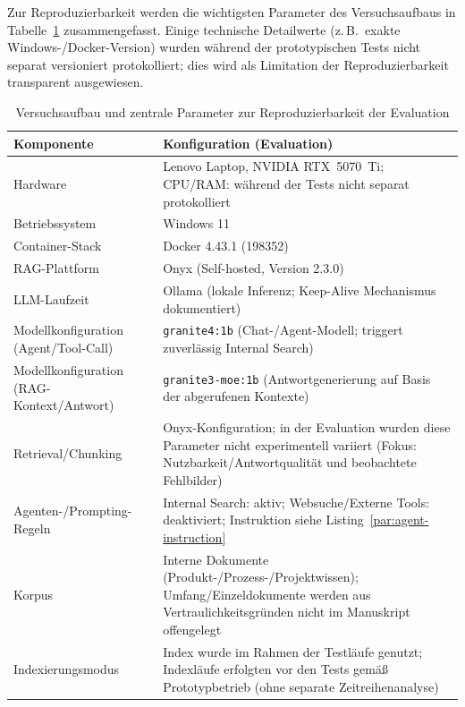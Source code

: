Zur Reproduzierbarkeit werden die wichtigsten Parameter des Versuchsaufbaus in Tabelle~\ref{tab:eval-setup} zusammengefasst.
Einige technische Detailwerte (z.\,B.\ exakte Windows-/Docker-Version) wurden während der prototypischen Tests nicht separat versioniert protokolliert; dies wird als Limitation der Reproduzierbarkeit transparent ausgewiesen.
\vspace{1cm}
\FloatBarrier
\begin{table}[htbp]
    \centering
    \small
    \begin{tabular}{p{4.2cm}p{9.2cm}}
        \toprule
        \textbf{Komponente} & \textbf{Konfiguration (Evaluation)} \\
        \midrule
        Hardware &
        Lenovo Laptop, NVIDIA RTX~5070~Ti; CPU/RAM: während der Tests nicht separat protokolliert \\
        Betriebssystem &
        Windows 11 \\
        Container-Stack &
        Docker 4.43.1 (198352) \\
        RAG-Plattform &
        Onyx (Self-hosted, Version 2.3.0)~\cite{onyx_github} \\
        LLM-Laufzeit &
        Ollama (lokale Inferenz; Keep-Alive Mechanismus dokumentiert)~\cite{ollama_keepalive} \\
        Modellkonfiguration (Agent/Tool-Call) &
        \texttt{granite4:1b} (Chat-/Agent-Modell; triggert zuverlässig Internal Search) \\
        Modellkonfiguration (RAG-Kontext/Antwort) &
        \texttt{granite3-moe:1b} (Antwortgenerierung auf Basis der abgerufenen Kontexte) \\
        Retrieval/Chunking &
        Onyx-Konfiguration; in der Evaluation wurden diese Parameter nicht experimentell variiert (Fokus: Nutzbarkeit/Antwortqualität und beobachtete Fehlbilder) \\
        Agenten-/Prompting-Regeln &
        Internal Search: aktiv; Websuche/Externe Tools: deaktiviert; Instruktion siehe Listing~\ref{par:agent-instruction} \\
        Korpus &
        Interne Dokumente (Produkt-/Prozess-/Projektwissen); Umfang/Einzeldokumente werden aus Vertraulichkeitsgründen nicht im Manuskript offengelegt \\
        Indexierungsmodus &
        Index wurde im Rahmen der Testläufe genutzt; Indexläufe erfolgten vor den Tests gemäß Prototypbetrieb (ohne separate Zeitreihenanalyse) \\
        \bottomrule
    \end{tabular}
    \caption{Versuchsaufbau und zentrale Parameter zur Reproduzierbarkeit der Evaluation}
    \label{tab:eval-setup}
\end{table}
\vspace{1cm}
\FloatBarrier
